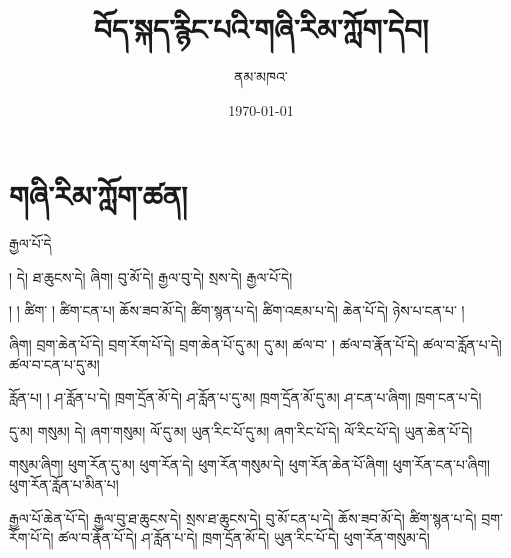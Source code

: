 \documentclass[12pt]{nextbook}
\title{བོད་སྐད་རྙིང་པའི་གཞི་རིམ་ཀློག་དེབ།}
\author{ནམ་མཁའ་}
\date{\today}
\begin{document}
\frontmatter
\maketitle
\tableofcontents
\mainmatter
\chapter{གཞི་རིམ་ཀློག་ཚན།}
\begin{readersection}{རྒྱལ་པོ་དེ}

  །
  དེ།
 ཐ་ཆུངས་དེ།
  ཞིག།
བུ་མོ་དེ།
རྒྱལ་བུ་དེ།
སྲས་དེ།
རྒྱལ་པོ་དེ།

 །
 །
ཚིག་ །
ཚིག་ངན་པ།
ཆོས་ཟབ་མོ་དེ།
ཚིག་སྙན་པ་དེ།
ཚིག་འཇམ་པ་དེ།
 ཆེན་པོ་དེ།
ཉེས་པ་ངན་པ་ །

  ཞིག།
བྲག་ཆེན་པོ་དེ།
བྲག་རོག་པོ་དེ།
བྲག་ཆེན་པོ་དུ་མ།
  དུ་མ།
ཚལ་བ་  །
ཚལ་བ་རྣོན་པོ་དེ།
ཚལ་བ་རློན་པ་དེ།
ཚལ་བ་ངན་པ་དུ་མ།

 རློན་པ།
 །
ཤ་རློན་པ་དེ།
ཁྲག་དྲོན་མོ་དེ།
ཤ་རློན་པ་དུ་མ།
ཁྲག་དྲོན་མོ་དུ་མ།
ཤ་ངན་པ་ཞིག།
ཁྲག་ངན་པ་དེ།

 དུ་མ།
 གསུམ།
  དེ།
ཞག་གསུམ།
ལོ་དུ་མ།
ཡུན་རིང་པོ་དུ་མ།
ཞག་རིང་པོ་དེ།
ལོ་རིང་པོ་དེ།
ཡུན་ཆེན་པོ་དེ།

 གསུམ་ཞིག།
ཕུག་རོན་དུ་མ།
ཕུག་རོན་དེ།
ཕུག་རོན་གསུམ་དེ།
ཕུག་རོན་ཆེན་པོ་ཞིག།
ཕུག་རོན་ངན་པ་ཞིག།
ཕུག་རོན་རློན་པ་མིན་པ།

རྒྱལ་པོ་ཆེན་པོ་དེ།
རྒྱལ་བུ་ཐ་ཆུངས་དེ།
སྲས་ཐ་ཆུངས་དེ།
བུ་མོ་ངན་པ་དེ།
ཆོས་ཟབ་མོ་དེ།
ཚིག་སྙན་པ་དེ།
བྲག་རོག་པོ་དེ།
ཚལ་བ་རྣོན་པོ་དེ།
ཤ་རློན་པ་དེ།
ཁྲག་དྲོན་མོ་དེ།
ཡུན་རིང་པོ་དེ།
ཕུག་རོན་གསུམ་དེ།

\end{readersection}
\end{document}
